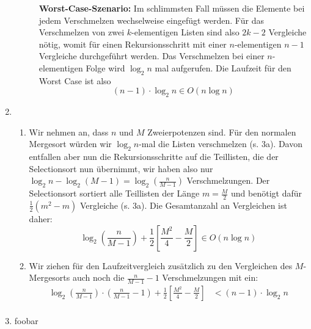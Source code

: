 \documentclass[a4paper,10pt]{scrartcl}
\begin{document}
\begin{enumerate}
\begin{description}
\textbf{Worst-Case-Szenario:}  Im schlimmsten Fall müssen die Elemente bei jedem Verschmelzen wechselweise eingefügt werden.
Für das Verschmelzen von zwei $k$-elementigen Listen sind also $2k-2$ Vergleiche nötig, womit für einen Rekursionsschritt mit einer $n$-elementigen $n - 1$ Vergleiche durchgeführt werden.
Das Verschmelzen bei einer $n$-elementigen Folge wird $\log_2 n$ mal aufgerufen.
Die Laufzeit für den Worst Case ist also
\[
 (n-1) \cdot \log_2 n \in O(n \log n)
\]
      \end{description}
\item \begin{enumerate}
       \item Wir nehmen an, dass $n$ und $M$ Zweierpotenzen sind. Für den normalen Mergesort würden wir $\log_2 n$-mal die Listen verschmelzen (s. 3a). Davon entfallen aber nun die Rekursionsschritte auf die Teillisten, die der Selectionsort nun übernimmt, wir haben also nur $\log_2 n - \log_2 (M-1) = \log_2\left(\frac{n}{M-1}\right)$ Verschmelzungen. Der Selectionsort sortiert alle Teillisten der Länge $m = \frac{M}{2}$ und benötigt dafür $\frac{1}{2}(m^2-m)$ Vergleiche (s. 3a). Die Gesamtanzahl an Vergleichen ist daher:
             \[\log_2\left(\frac{n}{M-1}\right) + \frac{1}{2}\left[\frac{M^2}{4}-\frac{M}{2}\right] \in O(n \log n)\]
       \item Wir ziehen für den Laufzeitvergleich zusätzlich zu den Vergleichen des $M$-Mergesorts auch noch die $\frac{n}{M-1}-1$ Verschmelzungen mit ein:
             \[
             \]
             \begin{align*}
              \log_2\left(\frac{n}{M-1}\right) \cdot \left(\frac{n}{M-1}-1\right) + \frac{1}{2}\left[\frac{M^2}{4}-\frac{M}{2}\right] &< (n-1) \cdot \log_2 n \\
             \end{align*}
      \end{enumerate}
\item foobar
      
      
      
      
\end{enumerate}
\end{document}
